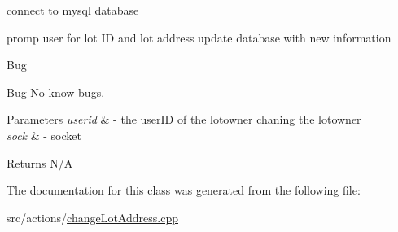 connect to mysql database 

promp user for lot ID and lot address update database with new information

\begin{DoxyRefDesc}{Bug}
\item[\mbox{\hyperlink{bug__bug000002}{Bug}}]No know bugs. \end{DoxyRefDesc}

\begin{DoxyParams}{Parameters}
{\em userid} & -\/ the user\+ID of the lotowner chaning the lotowner \\
\hline
{\em sock} & -\/ socket \\
\hline
\end{DoxyParams}
\begin{DoxyReturn}{Returns}
N/A 
\end{DoxyReturn}


The documentation for this class was generated from the following file\+:\begin{DoxyCompactItemize}
\item 
src/actions/\mbox{\hyperlink{change_lot_address_8cpp}{change\+Lot\+Address.\+cpp}}\end{DoxyCompactItemize}
